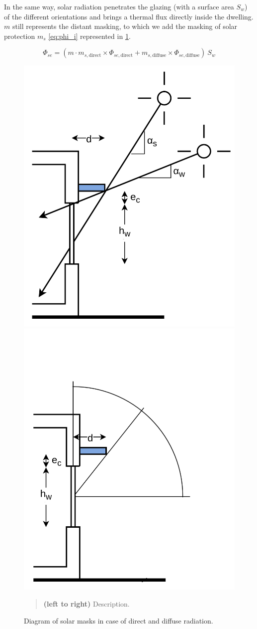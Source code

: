 \documentclass[11pt]{article}
\begin{document}
                In the same way, solar radiation penetrates the glazing (with a surface area $S_w$) of the different orientations and brings a thermal flux directly inside the dwelling. $m$ still represents the distant masking, to which we add the masking of solar protection $m_s$ \eqref{eq:phi_i} represented in \ref{fig:solar_mask_diagram}. 

                \begin{equation}\label{eq:phi_i}
                    \Phi_{se} = \left(m\cdot m_{s,\mathrm{direct}}\times \Phi_{se,\mathrm{direct}} + m_{s,\mathrm{diffuse}}\times\Phi_{se,\mathrm{diffuse}}\right)~ S_w
                \end{equation}

                \begin{figure}[ht]
                \centering
                
                \includegraphics[width=0.32\columnwidth]{figures/solar_mask_direct.png}\hspace{1cm}
                \includegraphics[width=0.32\columnwidth]{figures/solar_mask_diffuse.png}
                
                \caption{\label{fig:solar_mask_diagram} Diagram of solar masks in case of direct and diffuse radiation.}
                    \begin{quote}
                        \vspace{-2mm}
                        \small\noindent
                        \textbf{(left to right)} Description.
                    \end{quote}
                \end{figure}
\end{document}
